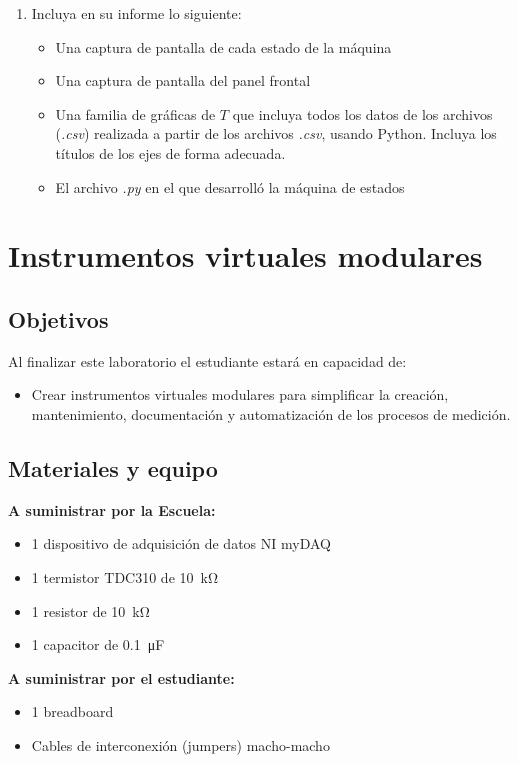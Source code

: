 \documentclass[12pt,letterpaper]{report}
\newcommand{\obj}{Objetivos}
\newcommand{\mat}{Materiales y equipo}
\newcommand{\capacidad}{Al finalizar este laboratorio el estudiante estará en capacidad de:}
\begin{document}
\begin{enumerate}
\begin{itemize}
\begin{itemize}
            \item \emph{world}: estado que concatena letra por letra la palabra "world" en el string, al finalizar la palabra pasa a estado \emph{end}
            \item \emph{end}: estado que termina la ejecución del programa.
        \end{itemize}
    \item Mostrar como avanza la concatenación del string
    \item Mostrar como avanza el tiempo en segundos en cada estado
\end{itemize}
\item Incluya en su informe lo siguiente:
    \begin{itemize}
        \item Una captura de pantalla de cada estado de la máquina 
        \item Una captura de pantalla del panel frontal
        \item Una familia de gráficas de $T$ que incluya todos los datos de los archivos (\emph{.csv}) realizada a partir de los archivos \emph{.csv}, usando Python. Incluya los títulos de los ejes de forma adecuada. 
        \item El archivo \emph{.py} en el que desarrolló la máquina de estados
    \end{itemize}

\end{enumerate}

\chapter{Instrumentos virtuales modulares}
\section{\obj}
\capacidad
\begin{itemize}
\item Crear instrumentos virtuales modulares para simplificar la creación, mantenimiento, documentación y automatización de los procesos de medición.
\end{itemize}

\section{\mat}
\textbf{A suministrar por la Escuela:}
\begin{itemize}
\item 1 dispositivo de adquisición de datos NI myDAQ
\item 1 termistor TDC310 de \SI{10}{\kilo\ohm} 
\item 1 resistor de \SI{10}{\kilo\ohm}
\item 1 capacitor de \SI{0.1}{\micro\farad}

\end{itemize}
\textbf{A suministrar por el estudiante:}
\begin{itemize}
\item 1 breadboard
\item Cables de interconexión (jumpers) macho-macho
\end{itemize}
\end{document}

